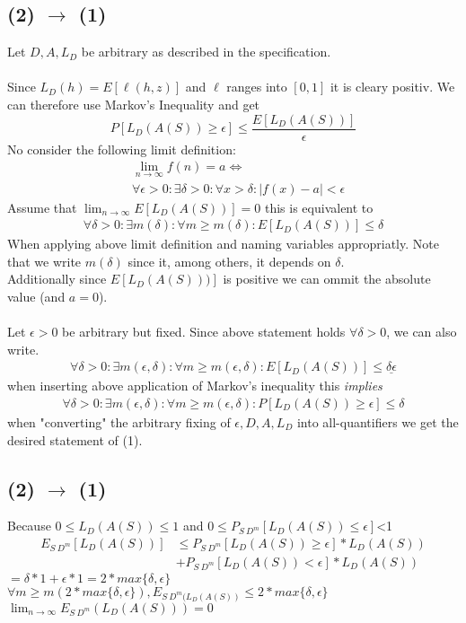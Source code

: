 \documentclass[12pt]{article}
\begin{document}
\subsection*{(2) $\rightarrow$ (1)}
Let $ D,A,L_D$ be arbitrary as described in the specification. \\\\
Since $L_D(h)  = E[\ell(h,z)]$ and $\ell$ ranges into $[0,1]$ it is cleary positiv. We can therefore use Markov's Inequality and get
\begin{equation*}
	P[L_D(A(S)) \geq \epsilon] \leq \frac{E[L_D(A(S))]}{\epsilon}
\end{equation*}
No consider the following limit definition:
\begin{align*}
	&\lim_{n \rightarrow \infty}  f(n)  = a \Leftrightarrow\\
		&\forall \epsilon> 0 :\exists \delta>0 :\forall x > \delta : |f(x) - a| < \epsilon
\end{align*}
Assume that $\lim_{n \rightarrow \infty} E[L_D(A(S))] = 0$ this is equivalent to
\begin{align*}
	\forall \delta> 0 :\exists m(\delta) :\forall m \geq m( \delta) : E[L_D(A(S))] \leq \delta
\end{align*}
When applying above limit definition and naming variables appropriatly. Note that we write $m(\delta)$ since it, among others, it depends on $\delta$.\\
Additionally since $E[L_D(A(S)))]$ is positive we can ommit the absolute value (and $a=0$). \\ \\
Let $\epsilon > 0$ be arbitrary but fixed.
Since above statement holds $\forall \delta>0$, we can also write.
\begin{align*}
	\forall \delta> 0 :\exists m (\epsilon, \delta) :\forall m \geq m( \epsilon,\delta) : E[L_D(A(S))] \leq \underline{\delta \epsilon}
\end{align*}
when inserting above application of Markov's inequality this \textit{implies}
\begin{align*}
	\forall \delta> 0 :\exists m (\epsilon, \delta) :\forall m \geq m( \epsilon, \delta ) : P[L_D(A(S)) \geq \epsilon] \leq \delta
\end{align*}
when "converting" the arbitrary fixing of $\epsilon,D,A,L_D$ into all-quantifiers we get the desired statement of (1).
\subsection*{(2) $\rightarrow$ (1)}
Because $0 \leq L_D(A(S)) \leq 1$  and  $0 \leq P_{S~D^m}[L_D(A(S)) \leq \epsilon]$<1\\
\begin{align*}
	E_{S~D^m}[L_D(A(S))] &\leq P_{S~D^m}[L_D(A(S))\geq \epsilon]* L_D(A(S))\\
	&+ P_{S~D^m}[L_D(A(S))<\epsilon] * L_D(A(S))
\end{align*}
$= \delta * 1 + \epsilon * 1 = 2 * max\{\delta, \epsilon\}$\\
$\forall m \geq m(2 * max \{ \delta, \epsilon \}), E_{S~D^m(L_D(A(S))} \leq 2 * max\{\delta, \epsilon\}$\\
$\lim_{n \rightarrow \infty} E_{S~D^m}(L_D(A(S))) = 0$
\end{document}

